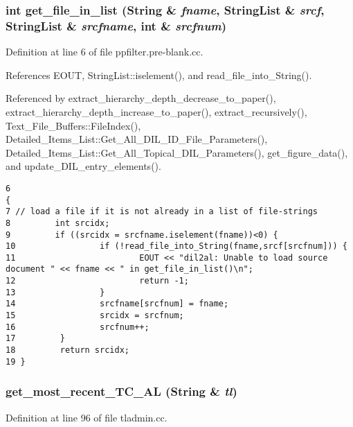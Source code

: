 \subsubsection{\setlength{\rightskip}{0pt plus 5cm}int get\_\-file\_\-in\_\-list ({\bf String} \& {\em fname}, {\bf String\-List} \& {\em srcf}, {\bf String\-List} \& {\em srcfname}, int \& {\em srcfnum})}\label{dil2al_8hh_a208}




Definition at line 6 of file ppfilter.pre-blank.cc.

References EOUT, String\-List::iselement(), and read\_\-file\_\-into\_\-String().

Referenced by extract\_\-hierarchy\_\-depth\_\-decrease\_\-to\_\-paper(), extract\_\-hierarchy\_\-depth\_\-increase\_\-to\_\-paper(), extract\_\-recursively(), Text\_\-File\_\-Buffers::File\-Index(), Detailed\_\-Items\_\-List::Get\_\-All\_\-DIL\_\-ID\_\-File\_\-Parameters(), Detailed\_\-Items\_\-List::Get\_\-All\_\-Topical\_\-DIL\_\-Parameters(), get\_\-figure\_\-data(), and update\_\-DIL\_\-entry\_\-elements().



\footnotesize\begin{verbatim}6                                                                                              {
7 // load a file if it is not already in a list of file-strings
8         int srcidx;
9         if ((srcidx = srcfname.iselement(fname))<0) {
10                 if (!read_file_into_String(fname,srcf[srcfnum])) {
11                         EOUT << "dil2al: Unable to load source document " << fname << " in get_file_in_list()\n";
12                         return -1;
13                 }
14                 srcfname[srcfnum] = fname;
15                 srcidx = srcfnum;
16                 srcfnum++;
17         }
18         return srcidx;
19 }
\end{verbatim}\normalsize 
{}
\subsubsection{ get\_\-most\_\-recent\_\-TC\_\-AL ({\bf String} \& {\em tl})}\label{dil2al_8hh_a320}




Definition at line 96 of file tladmin.cc.


